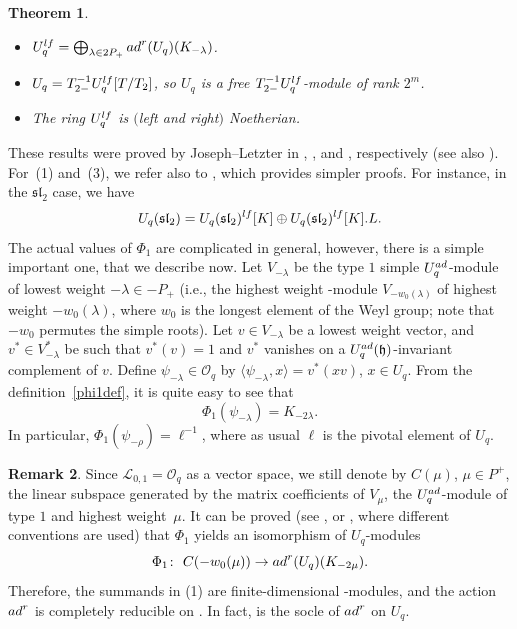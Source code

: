 \documentclass[11pt]{article}
\numberwithin{equation}{section}
\numberwithin{equation}{section}
\newtheorem{teo}{Theorem}[section]
\theoremstyle{definition}
\newtheorem{Remark}[teo]{Remark}
\newcommand{\Ll}{{\mathcal L}}
\newcommand{\Oo}{{\mathcal O}}
\newcommand{\ra}{\rightarrow}
\begin{document}
\begin{teo} \label{JLteo1} \quad
\begin{itemize}\itemsep=0pt
\item[$(1)$] $U_q^{\rm lf} = \bigoplus_{\lambda \in 2P_+} {\rm ad}^r(U_q)(K_{-\lambda})$.
\item[$(2)$] $U_q = T_{2-}^{-1}U_q^{\rm lf}[T/T_{2}]$, so $U_q$ is a free $T_{2-}^{-1}U_q^{\rm lf}$-module of rank $2^m$.
\item[$(3)$] The ring $U_q^{\rm lf}$ is $($left and right$)$ Noetherian.
\end{itemize}
\end{teo}

These results were proved by Joseph--Letzter in \cite[Theorem~4.10]{JL2}, \cite[Theorem 6.4]{JL}, and \cite[Theorem~7.4.8]{Jos}, respectively (see also \cite[Sections~7.1.6, 7.1.13 and~7.1.25]{Jos}). For~(1) and~(3), we refer also to \cite[Theorems~3.113 and~3.137]{VY}, which provides simpler proofs. For instance, in the ${\mathfrak{sl}_2}$ case, we have
\[U_q({\mathfrak{sl}_2}) = U_q({\mathfrak{sl}_2})^{\rm lf}[K] \oplus U_q({\mathfrak{sl}_2})^{\rm lf}[K].L.\]
The actual values of $\Phi_1$ are complicated in general, however, there is a simple important one, that we describe now. Let $V_{-\lambda}$ be the type $1$ simple $U_q^{\rm ad}$-module of lowest weight $-\lambda\in -P_+$ (i.e., the highest weight -module $V_{-w_0(\lambda)}$ of highest weight $-w_0(\lambda)$, where $w_0$ is the longest element of the Weyl group; note that $-w_0$ permutes the simple roots). Let $v\in V_{-\lambda}$ be a lowest weight vector, and $v^*\in V_{-\lambda}^*$ be such that $v^*(v)=1$ and $v^*$ vanishes on a $U_q^{\rm ad}(\mathfrak{h})$-invariant complement of $v$. Define $\psi_{-\lambda}\in \Oo_q$ by $\langle \psi_{-\lambda},x\rangle = v^*(xv)$, $x\in U_q$. From the definition~\eqref{phi1def}, it is quite easy to see that
\begin{equation}\label{Phi1psi-}
\Phi_1(\psi_{-\lambda}) = K_{-2\lambda}.
\end{equation}
In particular, $\Phi_1(\psi_{-\rho}) = \ell^{-1}$, where as usual $\ell$ is the pivotal element of $U_q$.

\begin{Remark}\label{remsocle} Since $\Ll_{0,1}=\Oo_q$ as a vector space, we still denote by $C(\mu)$, $\mu\in P^+$, the linear subspace generated by the matrix coefficients of $V_\mu$, the $U_q^{\rm ad}$-module of type $1$ and highest weight~$\mu$. It can be proved (see \cite[Section~7.1.22]{Jos}, or \cite[p.~156]{VY}, where different conventions are used) that $\Phi_1$ yields an isomorphism of $U_q$-modules
\begin{equation}\label{restphi1}
\Phi_{1}\colon\ C(-w_0(\mu)) \ra {\rm ad}^r(U_q)(K_{-2\mu}).
\end{equation}
Therefore, the summands in (1) are finite-dimensional -modules, and the action ${\rm ad}^r$ is completely reducible on . In fact,  is the socle of ${\rm ad}^r$ on $U_q$.
\end{Remark}
\end{document}

